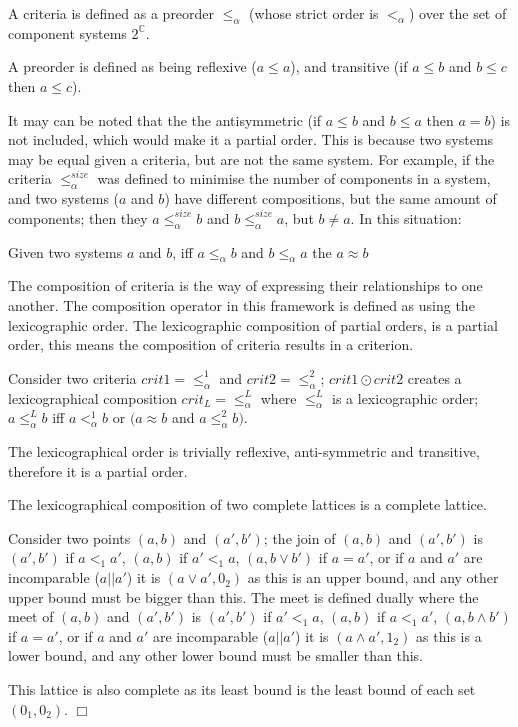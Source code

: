 \begin{defs}
A criteria is defined as a preorder $\leq_{\alpha}$ (whose strict order is $<_{\alpha}$) over the set of component systems $2^{\mathbb{C}}$.
\end{defs}
A preorder is defined as being reflexive ($a \leq a$),  and transitive (if $a \leq b$ and $b \leq c$ then $a \leq c$).

It may can be noted that the the antisymmetric (if $a \leq b$ and $b \leq a$ then $a = b$) is not included, which would make it a partial order.
This is because two systems may be equal given a criteria, but are not the same system.
For example, if the criteria $\leq^{size}_{\alpha}$ was defined to minimise the number of components in a system, 
and two systems ($a$ and $b$) have different compositions, but the same amount of components;
then they $a \leq^{size}_{\alpha} b$ and $b \leq^{size}_{\alpha} a$, but $b \neq a$.
In this situation:
\begin{defs}
Given two systems $a$ and $b$, iff $a \leq_{\alpha} b$ and $b \leq_{\alpha} a$ the $a \approx b$ 
\end{defs} 

The composition of criteria is the way of expressing their relationships to one another. 
The composition operator in this framework is defined as using the lexicographic order.
The lexicographic composition of partial orders, is a partial order, this means the composition of criteria results in a criterion.

\begin{defs}
Consider two criteria  $crit1 = \leq^1_{\alpha}$ and $crit2 = \leq^2_{\alpha}$;
$crit1 \odot crit2$ creates a lexicographical composition  $crit_L = \leq^L_{\alpha}$
where $\leq^L_{\alpha}$ is a lexicographic order;
$a \leq^L_{\alpha} b$ iff $a <^1_{\alpha} b$ or $(a \approx b$ and $a \leq^2_{\alpha} b)$.
\end{defs}

The lexicographical order is trivially reflexive, anti-symmetric and transitive, therefore it is a partial order.
\begin{prop}
The lexicographical composition of two complete lattices is a complete lattice.
\end{prop}
\begin{prof}
Consider two points $(a,b)$ and $(a',b')$; 
the join of $(a,b)$ and $(a',b')$ is $(a',b')$ if $a <_1 a'$,
$(a,b)$ if $a' <_1 a$,
$(a, b \vee b')$ if $a = a'$,
or if $a$ and $a'$ are incomparable ($a||a'$) it is $(a \vee a', 0_2)$
as this is an upper bound, and any other upper bound must be bigger than this.
The meet is defined dually where the meet of $(a,b)$ and $(a',b')$ is $(a',b')$ if $a' <_1 a$,
$(a,b)$ if $a <_1 a'$,
$(a, b \wedge b')$ if $a = a'$,
or if $a$ and $a'$ are incomparable ($a||a'$) it is $(a \wedge a',1_2)$
as this is a lower bound, and any other lower bound must be smaller than this.

This lattice is also complete as its least bound is the least bound of each set $(0_1,0_2)$.
$\Box$\end{prof}

